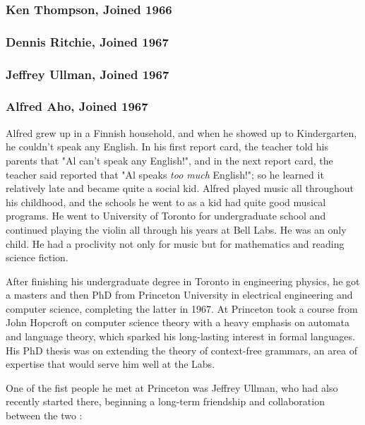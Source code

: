 \subsubsection{Ken Thompson, Joined 1966}


\subsubsection{Dennis Ritchie, Joined 1967}


\subsubsection{Jeffrey Ullman, Joined 1967}


\subsubsection{Alfred Aho, Joined 1967}

Alfred grew up in a Finnish household, and when he showed up to Kindergarten,
he couldn't speak any English.
In his first report card, the teacher told his parents that "Al can't speak any English!",
and in the next report card, the teacher said reported that "Al speaks \textit{too much} English!";
so he learned it relatively late and became quite a social kid.
Alfred played music all throughout his childhood, and the schools he went to
as a kid had quite good musical programs.
He went to University of Toronto for undergraduate school and continued playing
the violin all through his years at Bell Labs. He was an only child. He had a
proclivity not only for music but for mathematics and reading science fiction.

After finishing his undergraduate degree in Toronto in engineering physics,
he got a masters and then PhD
from Princeton University in electrical engineering and computer science,
completing the latter in 1967.
At Princeton took a course from John Hopcroft on computer science theory with a heavy emphasis on
automata and language theory, which sparked his long-lasting interest in formal languages.
His PhD thesis was on extending the theory of context-free grammars, an area of
expertise that would serve him well at the Labs.

One of the fist people he met at Princeton was Jeffrey Ullman, who had also recently
started there, beginning a long-term friendship and collaboration between the two
\cite{aho_oral_history_2022}:

